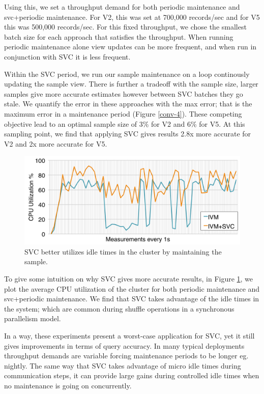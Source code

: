 Using this, we set a throughput demand for both periodic maintenance and svc+periodic maintenance.
For V2, this was set at 700,000 records/sec and for V5 this was 500,000 records/sec.
For this fixed throughput, we chose the smallest batch size for each approach that satisfies the throughput.
When running periodic maintenance alone view updates can be more frequent, and when run in conjunction with SVC it is less frequent.

Within the SVC period, we run our sample maintenance on a loop continously updating the sample view.
There is further a tradeoff with the sample size, larger samples give more accurate estimates however between SVC batches they go stale.
We quantify the error in these approaches with the max error; that is the maximum error in a maintenance period (Figure \ref{conv-4}).
These competing objective lead to an optimal sample size of 3\% for V2 and 6\% for V5.
At this sampling point, we find that applying SVC gives results 2.8x more accurate for V2 and 2x more accurate for V5.

\begin{figure}[t]
\centering
\includegraphics[scale=0.14]{exp/con_7.pdf}
 \caption{SVC better utilizes idle times in the cluster by maintaining the sample.\label{conv-5}} 
\end{figure}
To give some intuition on why SVC gives more accurate results, in Figure \ref{conv-5}, we plot the average CPU utilization of the cluster for both periodic maintenance and svc+periodic maintenance. 
We find that SVC takes advantage of the idle times in the system; which are common during shuffle operations in a synchronous parallelism model.

In a way, these experiments present a worst-case application for SVC, yet it still gives improvements in terms of query accuracy.
In many typical deployments throughput demands are variable forcing maintenance periods to be longer eg. nightly.
The same way that SVC takes advantage of micro idle times during communication steps, it can provide large gains during controlled idle times when no maintenance is going on concurrently.


